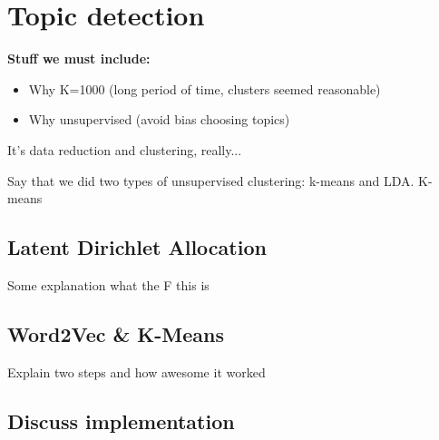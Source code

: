\section{Topic detection}
\textbf{Stuff we must include:}
\begin{itemize}
\item Why K=1000 (long period of time, clusters seemed reasonable)
\item Why unsupervised (avoid bias choosing topics)
\end{itemize}

\label{sec:topic_detection}
It's data reduction and clustering, really...

Say that we did two types of unsupervised clustering: k-means and LDA. K-means

\subsection{Latent Dirichlet Allocation}
Some explanation what the F this is

\lipsum[1]

\subsection{Word2Vec \& K-Means}
Explain two steps and how awesome it worked

\lipsum[1]

\subsection{Discuss implementation}
